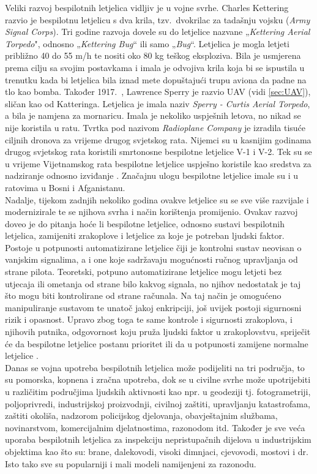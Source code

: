 \documentclass[times, utf8, diplomski]{fer}
\begin{document}
Veliki razvoj bespilotnih letjelica vidljiv je u vojne svrhe. Charles  Kettering  razvio  je  bespilotnu  letjelicu  s  dva  krila, tzv.~dvokrilac za tadašnju vojsku (\emph{Army Signal Corps}). Tri godine razvoja dovele su do letjelice nazvane „\emph{Kettering Aerial Torpedo}", odnosno „\emph{Kettering Bug}“ ili samo „\emph{Bug}“. Letjelica je mogla letjeti približno 40 do 55 m/h te nositi oko 80 kg teškog eksploziva. Bila je usmjerena prema cilju sa svojim postavkama i imala  je  odvojiva  krila  koja  bi  se ispustila u  trenutku kada  bi  letjelica  bila iznad  mete dopuštajući trupu aviona da padne na tlo kao bomba.  Također 1917.~, Lawrence Sperry je razvio UAV (vidi \ref{sec:UAV}), sličan kao od Katteringa. Letjelica je imala naziv \emph{Sperry - Curtis Aerial Torpedo}, a bila je namjena za mornaricu. Imala je  nekoliko uspješnih letova, no nikad se nije koristila u ratu. Tvrtka pod nazivom \emph{Radioplane Company} je izradila tisuće ciljnih dronova  za vrijeme drugog svjetskog rata. Nijemci su u kasnijim godinama drugog svjetskog rata koristili smrtonosne bespilotne letjelice V-1 i V-2. Tek su se u vrijeme Vijetnamskog rata bespilotne letjelice uspješno koristile kao sredstva za nadziranje odnosno izviđanje \citep{UAVSystems}. Značajnu ulogu bespilotne letjelice imale su i u ratovima u Bosni i Afganistanu.\\
Nadalje, tijekom zadnjih nekoliko godina ovakve letjelice su se sve više razvijale i modernizirale te se njihova svrha i način korištenja promijenio. Ovakav razvoj doveo je do pitanja hoće li bespilotne letjelice, odnosno sustavi bespilotnih letjelica, zamijeniti zrakoplove i letjelice za koje je potreban ljudski faktor. Postoje u potpunosti automatizirane letjelice čiji je kontrolni sustav neovisan o vanjskim signalima, a i one koje sadržavaju mogućnosti ručnog upravljanja  od  strane  pilota.  Teoretski,  potpuno  automatizirane  letjelice  mogu  letjeti  bez utjecaja ili ometanja od strane bilo kakvog signala, no njihov nedostatak je taj što mogu biti kontrolirane od strane računala. Na taj način je omogućeno manipuliranje sustavom te unatoč jakoj enkripciji,  još  uvijek  postoji  sigurnosni  rizik  i  opasnost.  Upravo  zbog  toga  te  same kontrole  i  sigurnosti  zrakoplova, i njihovih putnika, odgovornost koju pruža ljudski faktor u zrakoplovstvu, spriječit će da bespilotne letjelice postanu prioritet ili da u potpunosti zamijene normalne letjelice \citep{UAVSystems}.\\
Danas se vojna upotreba bespilotnih letjelica može podijeliti na tri područja, to su pomorska, kopnena i zračna upotreba, dok se u civilne  svrhe  može  upotrijebiti  u  različitim  područjima ljudskih  aktivnosti  kao  npr.  u  geodeziji  tj. fotogrametriji,   poljoprivredi,   industrijskoj proizvodnji,  civilnoj  zaštiti,  upravljanju katastrofama,  zaštiti  okoliša,  nadzorom policijskog    djelovanja,    obavještajnim službama,   novinarstvom,   komercijalnim djelatnostima, razonodom itd. Također  je  sve  veća  uporaba  bespilotnih letjelica za inspekciju   nepristupačnih dijelova  u industrijskim  objektima  kao  što su: brane, dalekovodi, visoki dimnjaci, cjevovodi, mostovi i dr. Isto tako sve su popularniji i mali modeli namijenjeni za razonodu.
\end{document}

